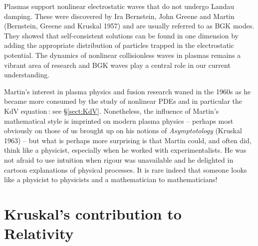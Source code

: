 \documentclass[11pt]{article}
\begin{document}
Plasmas support nonlinear electrostatic waves that do not undergo Landau damping. These were discovered by Ira Bernstein, John Greene and Martin 
(Bernstein, Greene and Kruskal 1957) and are usually referred to as BGK modes.  They showed that self-consistent solutions can be found in one dimension by adding the appropriate distribution of particles trapped in the electrostatic potential.  The dynamics of nonlinear collisionless waves in plasmas remains a vibrant area of research and BGK waves play a central role in our current understanding.

Martin's interest in plasma physics and fusion research waned in the 1960s as he became more consumed by the study of nonlinear PDEs and in particular the KdV equation\,: see \S\ref{sect:KdV}.  Nonetheless, the influence of Martin's mathematical style is imprinted on modern plasma physics -- perhaps most obviously on those of us brought up on his notions of \textit{Asymptotology} (Kruskal 1963) -- but what is perhaps more surprising is that Martin could, and often did, think like a physicist, especially when he worked with experimentalists.  He was not afraid to use intuition when rigour was unavailable and he delighted in cartoon explanations of physical processes.  It is rare indeed that someone looks like a physicist to physicists and a mathematician to mathematicians!


\section{\large Kruskal's contribution to Relativity}\label{sect:rel}
\end{document}
